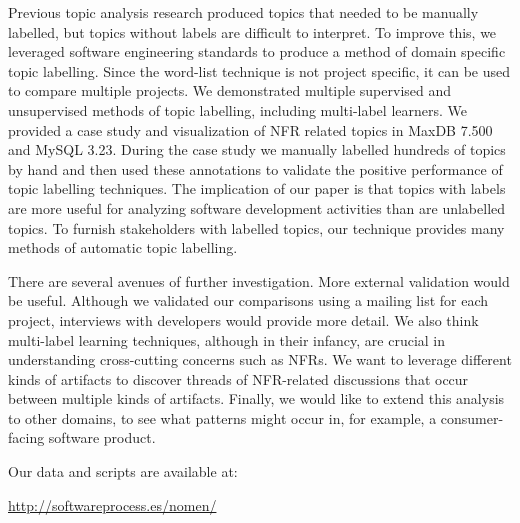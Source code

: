 \documentclass[]{sig-alternate}
\begin{document}
Previous topic analysis research produced topics that needed to be manually labelled, but topics without labels are difficult to interpret.
To improve this, we leveraged software engineering standards to produce a method of domain specific topic labelling.
Since the word-list technique is not project specific, it can be used to compare multiple projects.
We demonstrated multiple supervised and unsupervised methods of topic labelling, including multi-label learners.
We provided a case study and visualization of NFR related topics in MaxDB 7.500 and MySQL 3.23. 
During the case study we manually labelled hundreds of topics by hand and then used these annotations to validate the positive performance of topic labelling techniques.
The implication of our paper is that topics with labels are more useful for analyzing software development activities than are unlabelled topics. To furnish stakeholders with labelled topics, our technique provides many methods of automatic topic labelling.

 
There are several avenues of further investigation.  
More external validation would be useful. 
Although we validated our comparisons using a mailing list for each project, interviews with developers would provide more detail. 
We also think multi-label learning techniques, although in their infancy, are crucial in understanding cross-cutting concerns such as NFRs. 
We want to leverage different kinds of artifacts to discover threads of NFR-related discussions that occur between multiple kinds of artifacts.
Finally, we would like to extend this analysis to other domains, to see what patterns might occur in, for example, a consumer-facing software product.
 

\appendix

Our data and scripts are available at:

 \url{http://softwareprocess.es/nomen/}


%

\end{document}
